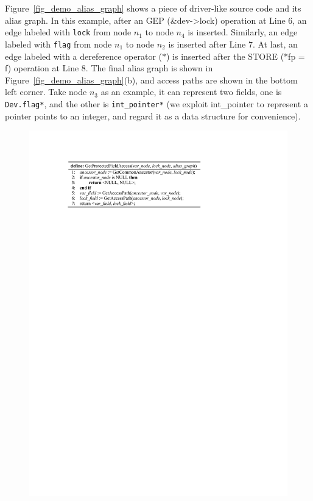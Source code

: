  Figure~\ref{fig_demo_alias_graph} shows a 
piece of driver-like source code and its alias graph. In this example, after an 
GEP (\&dev->lock) operation at Line 6, an edge labeled with {\tt lock} from 
node $\mathit{n_1}$ to node $\mathit{n_4}$ is inserted. Similarly, an edge 
labeled with {\tt flag} from node $\mathit{n_1}$ to node $\mathit{n_2}$ is 
inserted after Line 7. At last, an edge labeled with a dereference operator 
($\mathit{*}$) is inserted after the STORE (*fp = f) operation at Line 8. The 
final alias graph is shown in Figure~\ref{fig_demo_alias_graph}(b), and access 
paths are shown in the bottom left corner. Take node $\mathit{n_3}$ as an 
example, it can represent two fields, one is {\tt Dev.flag*}, and the other is 
{\tt int\_pointer*} (we exploit int\_pointer to represent a pointer points to 
an integer, and regard it as a data structure for convenience). 

\begin{figure}[htbp]
	\centering
	\includegraphics[width=1\linewidth]{figures/fig_pseudocode_get_access.pdf}
	\label{fig_pseudocode_get_access}
\end{figure}

